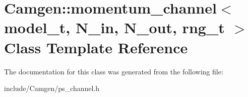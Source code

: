 \hypertarget{a00372}{\section{Camgen\-:\-:momentum\-\_\-channel$<$ model\-\_\-t, N\-\_\-in, N\-\_\-out, rng\-\_\-t $>$ Class Template Reference}
\label{a00372}
}


The documentation for this class was generated from the following file\-:\begin{DoxyCompactItemize}
\item 
include/\-Camgen/ps\-\_\-channel.\-h\end{DoxyCompactItemize}
